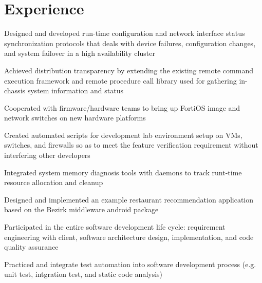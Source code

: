 \documentclass[hidelinks,letterpaper]{deedy-resume} %
\begin{document}
\begin{minipage}[t]{0.645\textwidth} %


\section{Experience}


\vspace{\topsep} %
\begin{tightitemize}
\item Designed and developed run-time configuration and network interface status synchronization protocols that deals with device failures, configuration changes, and system failover in a high availability cluster
\item Achieved distribution transparency by extending the existing remote command execution framework and remote procedure call library used for gathering in-chassis system information and status
\item Cooperated with firmware/hardware teams to bring up FortiOS image and network switches on new hardware platforms
\item Created automated scripts for development lab environment setup on VMs, switches, and firewalls so as to meet the feature verification requirement without interfering other developers
\item Integrated system memory diagnosis tools with daemons to track runt-time resource allocation and cleanup 
\end{tightitemize}

\sectionspace %


\begin{tightitemize}
\item Designed and implemented an example restaurant recommendation application based on the Bezirk middleware android package
\item Participated in the entire software development life cycle: requirement engineering with client, software architecture design, implementation, and code quality assurance
\item Practiced and integrate test automation into software development process (e.g. unit test, intgration test, and static code analysis)
\end{tightitemize}


\end{minipage}
\end{document}
